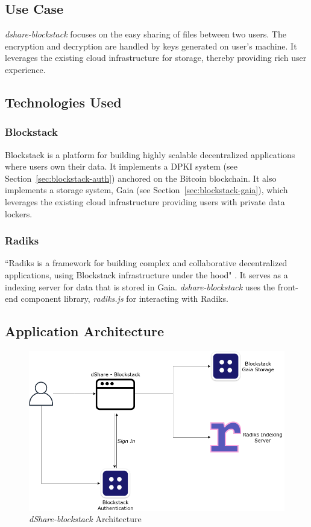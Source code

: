 \subsection{Use Case}
\textit{dshare-blockstack} focuses on the easy sharing of files between two users. The encryption and decryption are handled by keys generated on user's machine. It leverages the existing cloud infrastructure for storage, thereby providing rich user experience.

\subsection{Technologies Used}
\subsubsection{Blockstack}
Blockstack\cite{ali2016blockstack} is a platform for building highly scalable decentralized applications where users own their data. It implements a DPKI system (see Section~\ref{sec:blockstack-auth}) anchored on the Bitcoin blockchain. It also implements a storage system, Gaia (see Section~\ref{sec:blockstack-gaia}), which leverages the existing cloud infrastructure providing users with private data lockers.

\subsubsection{Radiks}
``Radiks\cite{github:radiks:server:1} is a framework for building complex and collaborative decentralized applications, using Blockstack infrastructure under the hood" \cite{web:radiks:1}. It serves as a indexing server for data that is stored in Gaia. \textit{dshare-blockstack} uses the front-end component library, \textit{radiks.js}\cite{github:radiksjs:1} for interacting with Radiks.

\subsection{Application Architecture}
\begin{figure}[h]
	\includegraphics[width=\linewidth]{figures/dshare-blockstack}
	\caption{\label{fig:dshare-blockstack} \textit{dShare-blockstack} Architecture}
\end{figure}

